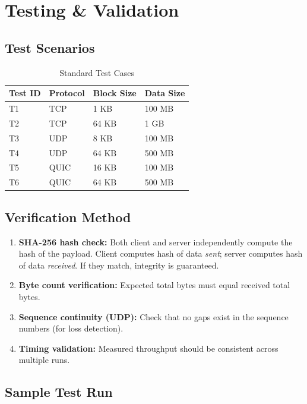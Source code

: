 \documentclass[12pt,a4paper]{article}
\begin{document}
\section{Testing & Validation}
\label{sec:testing}

\subsection{Test Scenarios}

\begin{table}[H]
\centering
\caption{Standard Test Cases}
\begin{tabular}{|l|l|l|l|}
\hline
\textbf{Test ID} & \textbf{Protocol} & \textbf{Block Size} & \textbf{Data Size} \\
\hline
T1 & TCP & 1 KB & 100 MB \\
T2 & TCP & 64 KB & 1 GB \\
T3 & UDP & 8 KB & 100 MB \\
T4 & UDP & 64 KB & 500 MB \\
T5 & QUIC & 16 KB & 100 MB \\
T6 & QUIC & 64 KB & 500 MB \\
\hline
\end{tabular}
\end{table}

\subsection{Verification Method}

\begin{enumerate}
  \item \textbf{SHA-256 hash check:} Both client and server independently compute the hash of the payload. Client computes hash of data \textit{sent}; server computes hash of data \textit{received}. If they match, integrity is guaranteed.
  \item \textbf{Byte count verification:} Expected total bytes must equal received total bytes.
  \item \textbf{Sequence continuity (UDP):} Check that no gaps exist in the sequence numbers (for loss detection).
  \item \textbf{Timing validation:} Measured throughput should be consistent across multiple runs.
\end{enumerate}

\subsection{Sample Test Run}
\end{document}
